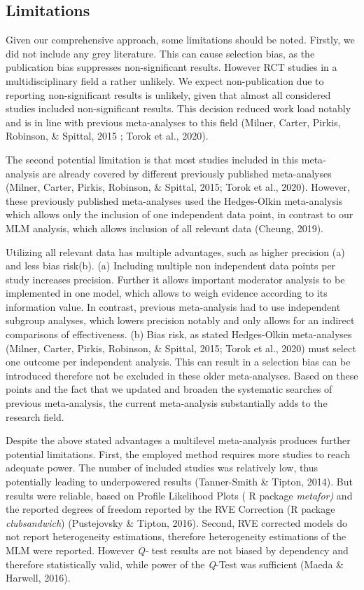 \documentclass[
  english,
  man]{apa6}
\begin{document}
\hypertarget{limitations}{%
\subsection{Limitations}\label{limitations}}

Given our comprehensive approach, some limitations should be noted. Firstly, we did not include any grey literature. This can cause selection bias, as the publication bias suppresses non-significant results. However RCT studies in a multidisciplinary field a rather unlikely. We expect non-publication due to reporting non-significant results is unlikely, given that almost all considered studies included non-significant results. This decision reduced work load notably and is in line with previous meta-analyses to this field (Milner, Carter, Pirkis, Robinson, \& Spittal, 2015 ; Torok et al., 2020).

The second potential limitation is that most studies included in this meta-analysis are already covered by different previously published meta-analyses (Milner, Carter, Pirkis, Robinson, \& Spittal, 2015; Torok et al., 2020). However, these previously published meta-analyses used the Hedges-Olkin meta-analysis which allows only the inclusion of one independent data point, in contrast to our MLM analysis, which allows inclusion of all relevant data (Cheung, 2019).

Utilizing all relevant data has multiple advantages, such as higher precision (a) and less bias risk(b). (a) Including multiple non independent data points per study increases precision. Further it allows important moderator analysis to be implemented in one model, which allows to weigh evidence according to its information value. In contrast, previous meta-analysis had to use independent subgroup analyses, which lowers precision notably and only allows for an indirect comparisons of effectiveness. (b) Bias risk, as stated Hedges-Olkin meta-analyses (Milner, Carter, Pirkis, Robinson, \& Spittal, 2015; Torok et al., 2020) must select one outcome per independent analysis. This can result in a selection bias can be introduced therefore not be excluded in these older meta-analyses. Based on these points and the fact that we updated and broaden the systematic searches of previous meta-analysis, the current meta-analysis substantially adds to the research field.

Despite the above stated advantages a multilevel meta-analysis produces further potential limitations. First, the employed method requires more studies to reach adequate power. The number of included studies was relatively low, thus potentially leading to underpowered results (Tanner-Smith \& Tipton, 2014). But results were reliable, based on Profile Likelihood Plots ( R package \emph{metafor)} and the reported degrees of freedom reported by the RVE Correction (R package \emph{clubsandwich}) (Pustejovsky \& Tipton, 2016). Second, RVE corrected models do not report heterogeneity estimations, therefore heterogeneity estimations of the MLM were reported. However \emph{Q-} test results are not biased by dependency and therefore statistically valid, while power of the \emph{Q}-Test was sufficient (Maeda \& Harwell, 2016).
\end{document}
